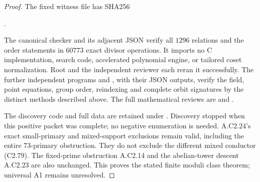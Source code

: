 \begin{proof}
The fixed witness file has SHA256
\begin{center}
.
\end{center}
The canonical checker
and its adjacent JSON verify all $1296$
relations and the order statements in
$60773$ exact divisor operations. It
imports no C implementation, search code,
accelerated polynomial engine, or tailored
coset normalization. Root and the independent
reviewer each reran it successfully.
The further independent programs
and
,
with their JSON outputs, verify the field,
point equations, group order, reindexing
and complete orbit signatures by the
distinct methods described above.
The full mathematical reviews are
and
.

The discovery code and full data are
retained under
.
Discovery stopped when this positive
packet was complete; no negative
enumeration is needed. A.C2.24's exact
small-primary and mixed-support exclusions
remain valid, including the entire
$73$-primary obstruction. They do not
exclude the different mixed conductor
(C2.79). The fixed-prime obstruction
A.C2.14 and the abelian-tower descent
A.C2.23 are also unchanged. This proves
the stated finite moduli class theorem;
universal A1 remains unresolved.
\end{proof}
